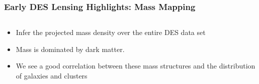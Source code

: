 \documentclass{beamer}
\begin{document}
\frame
{

    \frametitle{Early DES Lensing Highlights: Mass Mapping}

 
    \begin{columns}
        \begin{column}{0.4\textwidth}
            \begin{itemize}

                \item Infer the projected mass density
                    over the entire DES data set
                
                \item Mass is dominated by dark matter.

                \item We see a good correlation between these mass structures
                    and the distribution of galaxies and clusters


\end{itemize}
\end{column}
\end{columns}}
\end{document}
